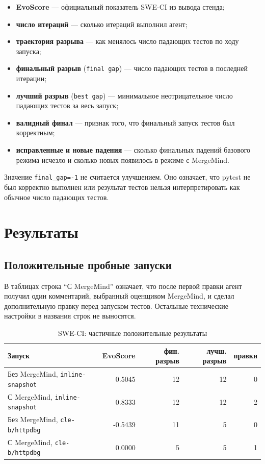 \documentclass[12pt,a4paper]{article}
\begin{document}
\begin{itemize}
  \item \textbf{EvoScore} --- официальный показатель SWE-CI из вывода стенда;
  \item \textbf{число итераций} --- сколько итераций выполнил агент;
  \item \textbf{траектория разрыва} --- как менялось число падающих тестов по
    ходу запуска;
  \item \textbf{финальный разрыв} (\texttt{final gap}) --- число падающих
    тестов в последней итерации;
  \item \textbf{лучший разрыв} (\texttt{best gap}) --- минимальное
    неотрицательное число падающих тестов за весь запуск;
  \item \textbf{валидный финал} --- признак того, что финальный запуск тестов
    был корректным;
  \item \textbf{исправленные и новые падения} --- сколько финальных падений
    базового режима исчезло и сколько новых появилось в режиме с MergeMind.
\end{itemize}

Значение \texttt{final\_gap=-1} не считается улучшением. Оно означает, что
pytest не был корректно выполнен или результат тестов нельзя интерпретировать
как обычное число падающих тестов.

\section{Результаты}

\subsection{Положительные пробные запуски}

В таблицах строка ``С MergeMind'' означает, что после первой правки агент
получил один комментарий, выбранный оценщиком MergeMind, и сделал дополнительную
правку перед запуском тестов. Остальные технические настройки в названия строк
не выносятся.

\begin{table}[h]
\centering
\small
\caption{SWE-CI: частичные положительные результаты}
\begin{tabularx}{\textwidth}{Yrrrr}
  \toprule
  Запуск & EvoScore & фин. разрыв & лучш. разрыв & правки \\
  \midrule
  Без MergeMind, \texttt{inline-snapshot} & 0.5045 & 12 & 12 & 0 \\
  С MergeMind, \texttt{inline-snapshot} & 0.8333 & 12 & 12 & 2 \\
  Без MergeMind, \texttt{cle-b/httpdbg} & -0.5439 & 11 & 5 & 0 \\
  С MergeMind, \texttt{cle-b/httpdbg} & 0.0000 & 5 & 5 & 1 \\
  \bottomrule
\end{tabularx}
\end{table}
\end{document}
